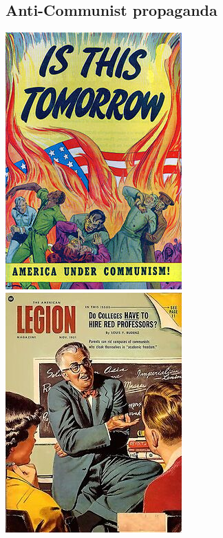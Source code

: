 \documentclass[12pt,a4paper]{article}
\begin{document}
	\subsection{Anti-Communist propaganda}
	\label{sec:Propaganda}
	\includegraphics{Propaganda/is-this-tomorrow.jpg}
	\includegraphics{Propaganda/colleges-hire-red-professors.jpg}
	
	\newpage
	\printbibliography[title=Bibliography]
	\vskip 1cm
	
\end{document}
